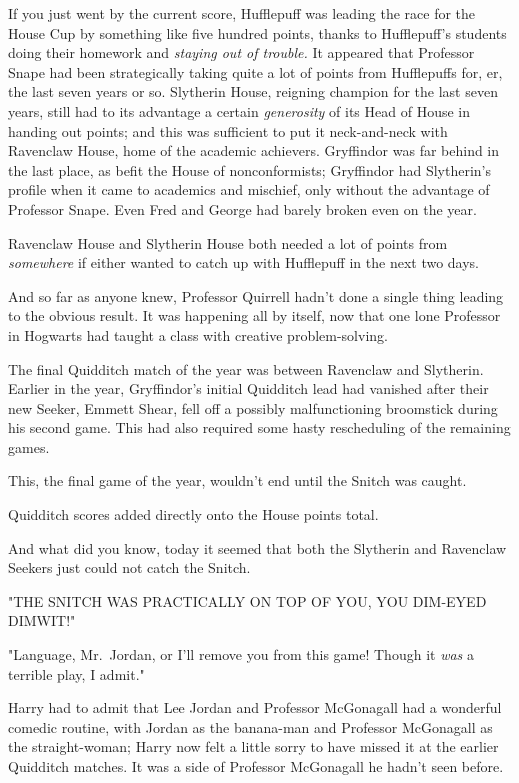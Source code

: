 If you just went by the current score, Hufflepuff was leading the race for the
House Cup by something like five hundred points, thanks to Hufflepuff's
students doing their homework and \emph{staying out of trouble.} It appeared
that Professor Snape had been strategically taking quite a lot of points from
Hufflepuffs for, er, the last seven years or so. Slytherin House, reigning
champion for the last seven years, still had to its advantage a certain
\emph{generosity} of its Head of House in handing out points; and this was
sufficient to put it neck-and-neck with Ravenclaw House, home of the academic
achievers. Gryffindor was far behind in the last place, as befit the House of
nonconformists; Gryffindor had Slytherin's profile when it came to academics
and mischief, only without the advantage of Professor Snape. Even Fred and
George had barely broken even on the year.

Ravenclaw House and Slytherin House both needed a lot of points from
\emph{somewhere} if either wanted to catch up with Hufflepuff in the next two
days.

And so far as anyone knew, Professor Quirrell hadn't done a single thing
leading to the obvious result. It was happening all by itself, now that one
lone Professor in Hogwarts had taught a class with creative problem-solving.

The final Quidditch match of the year was between Ravenclaw and Slytherin.
Earlier in the year, Gryffindor's initial Quidditch lead had vanished after
their new Seeker, Emmett Shear, fell off a possibly malfunctioning broomstick
during his second game. This had also required some hasty rescheduling of the
remaining games.

This, the final game of the year, wouldn't end until the Snitch was caught.

Quidditch scores added directly onto the House points total.

And what did you know, today it seemed that both the Slytherin and Ravenclaw
Seekers just could{\el} not{\el} catch{\el} the{\el} Snitch.

"THE SNITCH WAS PRACTICALLY ON TOP OF YOU, YOU DIM-EYED DIMWIT!"

"Language, Mr.~Jordan, or I'll remove you from this game! Though it \emph{was}
a terrible play, I admit."

Harry had to admit that Lee Jordan and Professor McGonagall had a wonderful
comedic routine, with Jordan as the banana-man and Professor McGonagall as the
straight-woman; Harry now felt a little sorry to have missed it at the earlier
Quidditch matches. It was a side of Professor McGonagall he hadn't seen before.

